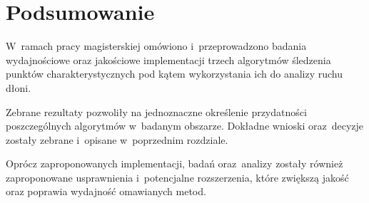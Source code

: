 \chapter{Podsumowanie}\label{Section_Podsumowanie}

W~ramach pracy magisterskiej omówiono i~przeprowadzono badania wydajnościowe oraz jakościowe implementacji trzech algorytmów śledzenia punktów charakterystycznych pod kątem wykorzystania ich do analizy ruchu dłoni.

Zebrane rezultaty pozwoliły na jednoznaczne określenie przydatności poszczególnych algorytmów w~badanym obszarze. Dokładne wnioski oraz~decyzje zostały zebrane i~opisane w~poprzednim rozdziale.

Oprócz zaproponowanych implementacji, badań oraz~analizy zostały również zaproponowane usprawnienia i~potencjalne rozszerzenia, które zwiększą jakość oraz poprawia wydajność omawianych metod.